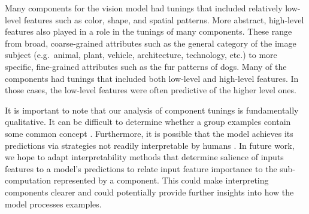 \documentclass[dvipsnames]{article}
\begin{document}
Many components for the vision model had tunings that included relatively low-level features such as color, shape, and spatial patterns.
More abstract, high-level features also played in a role in the tunings of many components.
These range from broad, coarse-grained attributes such as the general category of the image subject (e.g.\ animal, plant, vehicle, architecture, technology, etc.) to more specific, fine-grained attributes such as the fur patterns of dogs.
Many of the components had tunings that included both low-level and high-level features.
In those cases, the low-level features were often predictive of the higher level ones.

It is important to note that our analysis of component tunings is fundamentally qualitative.
It can be difficult to determine whether a group examples contain some common concept \citep{bolukbasi2021interpretability}.
Furthermore, it is possible that the model achieves its predictions via strategies not readily interpretable by humans \citep{dalvi2022discovering}.
In future work, we hope to adapt interpretability methods that determine salience of inputs features to a model's predictions to relate input feature importance to the sub-computation represented by a component.
This could make interpreting components clearer and could potentially provide further insights into how the model processes examples.




\end{document}
